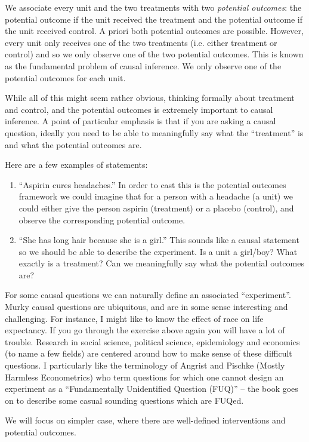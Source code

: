 \documentclass[twoside,12pt]{article}
\begin{document}
We associate every unit and the two treatments with two \emph{potential outcomes}: the potential outcome if the unit received the treatment and the potential outcome if the unit received control. 
A priori both potential outcomes are possible. However, every unit only receives one of the two treatments (i.e. either treatment or control) and so we only observe one of the two potential outcomes.
This is known as the fundamental problem of causal inference. We only observe one of the potential outcomes for each unit. 

While all of this might seem rather obvious, thinking formally about treatment and control, and the potential outcomes is extremely important to causal inference. A point of particular emphasis is that if you are asking a causal question, ideally you need to be able to meaningfully say what the ``treatment'' is and what the potential outcomes are.

Here are a few examples of statements:
\begin{enumerate}
\item ``Aspirin cures headaches.'' In order to cast this is the potential outcomes framework we could
imagine that for a person with a headache (a unit) we could either give the person aspirin (treatment) or a placebo (control), and observe the corresponding potential outcome. 
\item ``She has long hair because she is a girl.'' This sounds like a causal statement so we should be able to describe the experiment. Is a unit a girl/boy? What exactly is a treatment? Can we meaningfully say what the potential outcomes are?
\end{enumerate}
For some causal questions we can naturally define an associated ``experiment''. 
Murky causal questions are ubiquitous, and are in some sense interesting and challenging. For instance, I might like to know the effect of race on life expectancy. If you go through the exercise above again you will have a lot of trouble. Research in social science, political science, epidemiology and economics (to name a few fields) are centered around how to make sense of these difficult questions.
I particularly like the terminology of Angrist and Pischke (Mostly Harmless Econometrics) who term questions for which one cannot design an experiment as a ``Fundamentally Unidentified Question (FUQ)'' -- the book goes on to describe some casual sounding questions which are FUQed.

We will focus on simpler case, where there are well-defined interventions and potential outcomes. 
\end{document}
